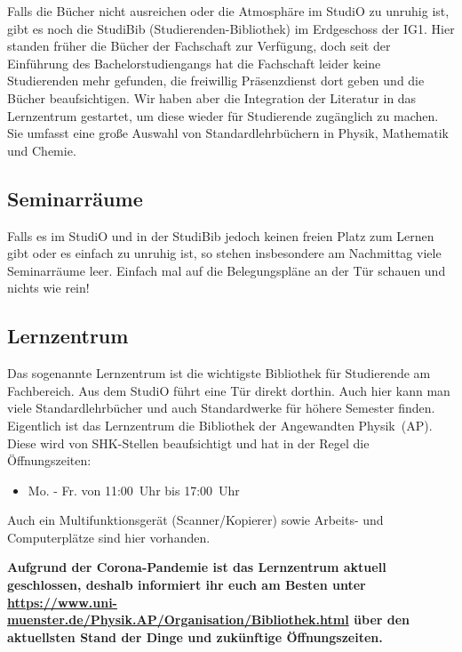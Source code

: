 \begin{multicols*}{2}
Falls die Bücher nicht ausreichen oder die Atmosphäre im StudiO zu unruhig ist, gibt es noch die StudiBib (Studierenden-Bibliothek) im Erdgeschoss der IG1.
Hier standen früher die Bücher der Fachschaft zur Verfügung, doch seit der Einführung des Bachelorstudiengangs hat die Fachschaft leider keine Studierenden mehr gefunden, die freiwillig Präsenzdienst dort geben und die Bücher beaufsichtigen.
Wir haben aber die Integration der Literatur in das Lernzentrum gestartet, um diese wieder für Studierende zugänglich zu machen.
Sie umfasst eine große Auswahl von Standardlehrbüchern in Physik, Mathematik und Chemie.

\subsection{Seminarräume}
Falls es im StudiO und in der StudiBib jedoch keinen freien Platz zum Lernen gibt oder es einfach zu unruhig ist, so stehen insbesondere am Nachmittag viele Seminarräume leer.
Einfach mal auf die Belegungspläne an der Tür schauen und nichts wie rein!

\subsection{Lernzentrum}
Das sogenannte Lernzentrum ist die wichtigste Bibliothek für Studierende am Fachbereich.
Aus dem StudiO führt eine Tür direkt dorthin.
Auch hier kann man viele Standardlehrbücher und auch Standardwerke für höhere Semester finden.
Eigentlich ist das Lernzentrum die Bibliothek der Angewandten Physik~(AP).
Diese wird von SHK-Stellen beaufsichtigt und hat in der Regel die Öffnungszeiten:
\begin{itemize}
	\item Mo. - Fr. von 11:00~Uhr bis 17:00~Uhr 
\end{itemize}
Auch ein Multifunktionsgerät (Scanner/Kopierer) sowie Arbeits- und Computerplätze sind hier vorhanden.

\textbf{Aufgrund der Corona-Pandemie ist das Lernzentrum aktuell geschlossen, deshalb informiert ihr euch am Besten unter \url{https://www.uni-muenster.de/Physik.AP/Organisation/Bibliothek.html} über den aktuellsten Stand der Dinge und zukünftige Öffnungszeiten.}

\begin{center}
\end{center}


\end{multicols*}
